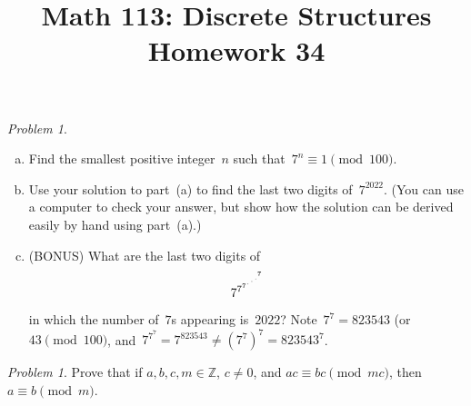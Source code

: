 \documentclass[11pt,twoside]{amsart}
\title{Math 113: Discrete Structures\\ Homework 34}
\theoremstyle{plain}
\theoremstyle{remark}
\newtheorem{prob}[prop]{Problem}
\theoremstyle{definition}
\theoremstyle{definition}
\newcommand{\ZZ}{\mathbb{Z}}
\begin{document}
\maketitle



\begin{prob}\ 
  \begin{enumerate}[(a)]
    \item Find the smallest positive integer~$n$ such that~$7^n\equiv 1
      \pmod{100}$.

    \item Use your solution to part~(a) to find the last two digits
      of~$7^{2022}$. (You can use a computer to check your answer, but show how
	the solution can be derived easily by hand using part~(a).)

    \item (BONUS) 
      What are the last two digits of
      \[
	7^{7^{7^{\iddots^{\vspace{-5pt}7}}}}
      \]
      in which the number of~$7$s appearing is~$2022$?  Note~$7^7=823543$
      (or~$43\pmod{100}$, and~$7^{7^{7}}=7^{823543}\neq (7^7)^7=823543^7$.
  \end{enumerate}
\end{prob}

\begin{prob}
Prove that if $a,b,c,m\in \ZZ$, $c\ne 0$, and $ac\equiv bc\pmod{mc}$, then $a\equiv b\pmod{m}$.
\end{prob}
\end{document}
